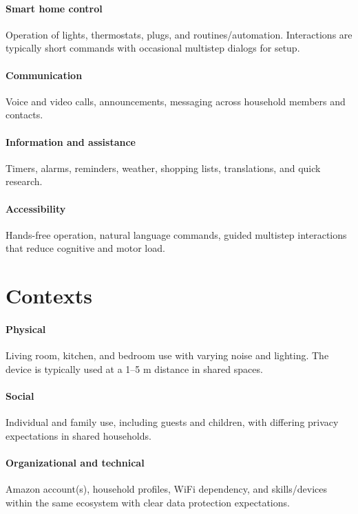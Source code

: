 \documentclass[a4paper,10pt]{article}
\begin{document}
    \paragraph{Smart home control}
    Operation of lights, thermostats, plugs, and routines/automation.
    Interactions are typically short commands with occasional multistep dialogs for setup.

    \paragraph{Communication}
    Voice and video calls, announcements, messaging across household members and contacts.

    \paragraph{Information and assistance}
    Timers, alarms, reminders, weather, shopping lists, translations, and quick research.

    \paragraph{Accessibility}
    Hands-free operation, natural language commands, guided multistep interactions that reduce cognitive and motor load.

    \section{Contexts}\label{sec:contexts}

    \paragraph{Physical}
    Living room, kitchen, and bedroom use with varying noise and lighting.
    The device is typically used at a 1--5 m distance in shared spaces.

    \paragraph{Social}
    Individual and family use, including guests and children, with differing privacy expectations in shared households.

    \paragraph{Organizational and technical}
    Amazon account(s), household profiles, Wi\-Fi dependency, and skills/devices within the same ecosystem with clear data protection expectations.
\end{document}

